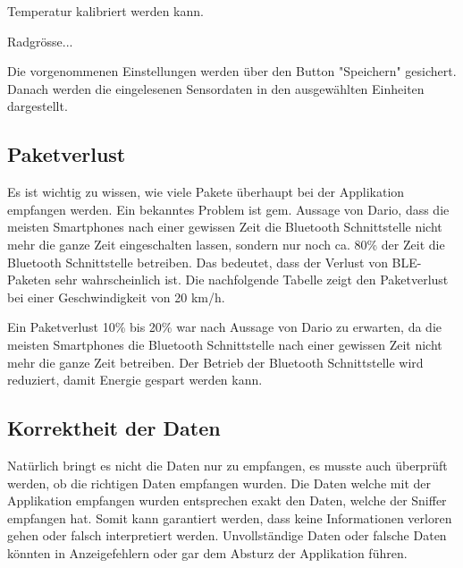 Temperatur kalibriert werden kann. 
 
 
Radgrösse... 
  
Die vorgenommenen Einstellungen werden über den Button "Speichern" gesichert. Danach werden die eingelesenen Sensordaten in den ausgewählten Einheiten dargestellt.

\subsection{Paketverlust}

Es ist wichtig zu wissen, wie viele Pakete überhaupt bei der Applikation empfangen werden. Ein bekanntes Problem ist gem. Aussage von Dario, dass die meisten Smartphones nach einer gewissen Zeit die Bluetooth Schnittstelle nicht mehr die ganze Zeit eingeschalten lassen, sondern nur noch ca. 80\thinspace\% der Zeit die Bluetooth Schnittstelle betreiben. Das bedeutet, dass der Verlust von BLE-Paketen sehr wahrscheinlich ist. Die nachfolgende Tabelle zeigt den Paketverlust bei einer Geschwindigkeit von 20 km/h.





Ein Paketverlust 10\thinspace\% bis 20\thinspace\% war nach Aussage von Dario zu erwarten, da die meisten Smartphones die Bluetooth Schnittstelle nach einer gewissen Zeit nicht mehr die ganze Zeit betreiben. Der Betrieb der Bluetooth Schnittstelle wird reduziert, damit Energie gespart werden kann. 


\subsection{Korrektheit der Daten}

Natürlich bringt es nicht die Daten nur zu empfangen, es musste auch überprüft werden, ob die richtigen Daten empfangen wurden. Die Daten welche mit der Applikation empfangen wurden entsprechen exakt den Daten, welche der Sniffer empfangen hat. Somit kann garantiert werden, dass keine Informationen verloren gehen oder falsch interpretiert werden. Unvollständige Daten oder falsche Daten könnten in Anzeigefehlern oder gar dem Absturz der Applikation führen.









